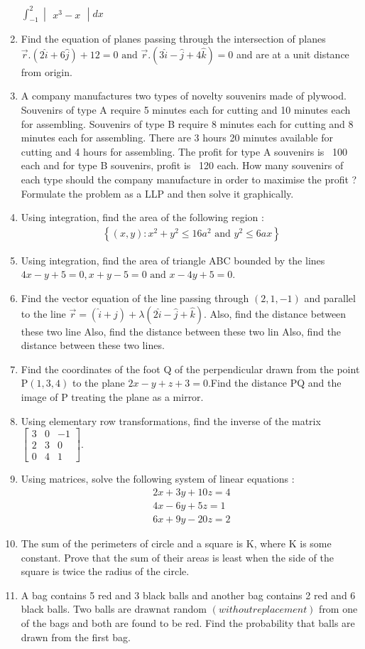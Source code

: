 \documentclass[12pt,-letter paper]{article}
\providecommand{\brak}[1]{\ensuremath{\left (#1\right)}}
\providecommand{\cbrak}[1]{\ensuremath{\left\{#1\right\}}}
\theoremstyle{remark}
\newcommand{\mydet}[1]{\ensuremath{\begin{vmatrix}#1\end{vmatrix}}}
\begin{document}
\begin{enumerate}
	$\int_{-1}^2 \mydet{x^3 - x} dx$
\item  Find the equation of planes passing through the intersection of planes $\vec{r} . \brak{2\hat{i} + 6\hat{j}} + 12 = 0 \text{ and } \vec{r} . \brak{3\hat{i} - \hat{j} + 4\hat{k}} = 0$ and are at a unit distance from origin.
\item  A company manufactures two types  of novelty souvenirs made of plywood. Souvenirs of type A require 5 minutes each for cutting and 10 minutes each for assembling. Souvenirs of type B require 8 minutes each for cutting and 8 minutes each for assembling. There are 3 hours 20 minutes available for cutting and 4 hours for assembling. The profit for type A souvenirs is \rupee~{100} each and for type B souvenirs, profit is \rupee~{120} each. How many souvenirs of each type should the company manufacture in order to maximise the profit ? Formulate the problem as a LLP and then solve it graphically.
\item  Using integration, find the area of the following region :
\begin{align*}
\cbrak{\brak{x, y} : x^2 + y^2 \leq 16a^2 \text{ and } y^2 \leq 6ax}
\end{align*}
\item  Using integration, find the area of triangle ABC bounded by the lines $4x-y+5=0, x+y-5=0 \text{ and }x-4y+5=0$.
\item  Find the vector equation of the line passing through \brak{2, 1, -1} and parallel to the line $\vec{r}=\brak{\hat{i}+\hat{j}}+\lambda\brak{2\hat{i}-\hat{j}+\hat{k}}$. Also, find the distance between these two line Also, find the distance between these two lin Also, find the distance between these two lines.
\item  Find the coordinates of the foot Q of the perpendicular drawn from the point P\brak{1, 3, 4} to the plane $2x-y+z+3=0$.Find the distance PQ and the image of P treating the plane as a mirror.
\item  Using elementary row transformations, find the inverse of the matrix $\begin{bmatrix}
		3 & 0 & -1\\
		2 & 3 & 0\\
		0 & 4 & 1
\end{bmatrix}$.
\item Using matrices, solve the following system of linear equations : 
\begin{align*}
2x+3y+10z=4\\4x-6y+5z=1\\6x+9y-20z=2
\end{align*}
\item The sum of the perimeters of circle and a square is K, where K is some constant. Prove that the sum of their areas is least when the side of the square is twice the radius of the circle.
\item A bag contains 5 red and 3 black balls and another bag contains 2 red and 6 black balls. Two balls are drawnat random \brak{without replacement} from one of the bags and both are found to be red. Find the probability that balls are drawn from the first bag.  
\end{enumerate}
\end{document}
